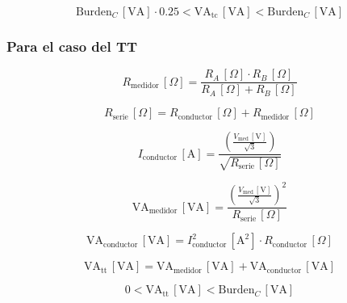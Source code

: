 \begin{equation*}
\text{Burden}_{C} \, [\text{VA}] \cdot 0.25 < \text{VA}_{\text{tc}} \, [\text{VA}] < \text{Burden}_{C} \, [\text{VA}]
\end{equation*}

\subsubsection{Para el caso del TT}
\begin{equation*}
R_{\text{medidor}} \, [\Omega] = \frac{R_A \, [\Omega] \cdot R_B \, [\Omega]}{R_A \, [\Omega] + R_B \, [\Omega]}
\end{equation*}

\begin{equation*}
R_{\text{serie}} \, [\Omega] = R_{\text{conductor}} \, [\Omega] + R_{\text{medidor}} \, [\Omega]
\end{equation*}

\begin{equation*}
I_{\text{conductor}} \, [\text{A}] = \frac{\left(\frac{V_{\text{med}} \, [\text{V}]}{\sqrt{3}}\right)}{\sqrt{R_{\text{serie}} \, [\Omega]}}
\end{equation*}

\begin{equation*}
\text{VA}_{\text{medidor}} \, [\text{VA}] = \frac{\left(\frac{V_{\text{med}} \, [\text{V}]}{\sqrt{3}}\right)^2}{R_{\text{serie}} \, [\Omega]}
\end{equation*}

\begin{equation*}
\text{VA}_{\text{conductor}} \, [\text{VA}] = I_{\text{conductor}}^2 \, [\text{A}^2] \cdot R_{\text{conductor}} \, [\Omega]
\end{equation*}

\begin{equation*}
\text{VA}_{\text{tt}} \, [\text{VA}] = \text{VA}_{\text{medidor}} \, [\text{VA}] + \text{VA}_{\text{conductor}} \, [\text{VA}]
\end{equation*}

\begin{equation*}
0 < \text{VA}_{\text{tt}} \, [\text{VA}] < \text{Burden}_{C} \, [\text{VA}]
\end{equation*}
